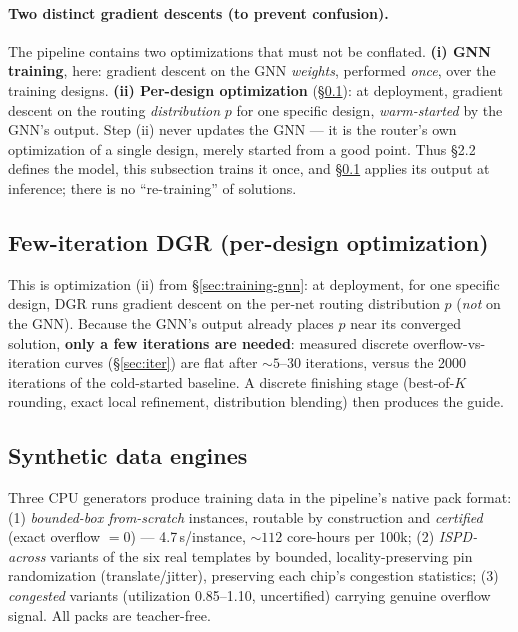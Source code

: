 \documentclass[11pt]{article}
\begin{document}
\paragraph{Two distinct gradient descents (to prevent confusion).} The
pipeline contains two optimizations that must not be conflated. \textbf{(i)
GNN training}, here: gradient descent on the GNN \emph{weights}, performed
\emph{once}, over the training designs. \textbf{(ii) Per-design optimization}
(\S\ref{sec:fewiter}): at deployment, gradient descent on the routing
\emph{distribution} $p$ for one specific design, \emph{warm-started} by the
GNN's output. Step (ii) never updates the GNN --- it is the router's own
optimization of a single design, merely started from a good point. Thus \S2.2
defines the model, this subsection trains it once, and \S\ref{sec:fewiter}
applies its output at inference; there is no ``re-training'' of solutions.

\subsection{Few-iteration DGR (per-design optimization)}\label{sec:fewiter}
This is optimization (ii) from \S\ref{sec:training-gnn}: at deployment, for
one specific design, DGR runs gradient descent on the per-net routing
distribution $p$ (\emph{not} on the GNN). Because the GNN's output already
places $p$ near its converged solution, \textbf{only a few iterations are
needed}: measured discrete overflow-vs-iteration curves (\S\ref{sec:iter})
are flat after ${\sim}5$--$30$ iterations, versus the 2000 iterations of the
cold-started baseline. A discrete finishing stage (best-of-$K$ rounding,
exact local refinement, distribution blending) then produces the guide.

\subsection{Synthetic data engines}
Three CPU generators produce training data in the pipeline's native pack
format: (1) \emph{bounded-box from-scratch} instances, routable by
construction and \emph{certified} (exact overflow $=0$) --- 4.7\,s/instance,
${\sim}112$ core-hours per 100k; (2) \emph{ISPD-across} variants of the six
real templates by bounded, locality-preserving pin randomization
(translate/jitter), preserving each chip's congestion statistics; (3)
\emph{congested} variants (utilization 0.85--1.10, uncertified) carrying
genuine overflow signal. All packs are teacher-free.
\end{document}
